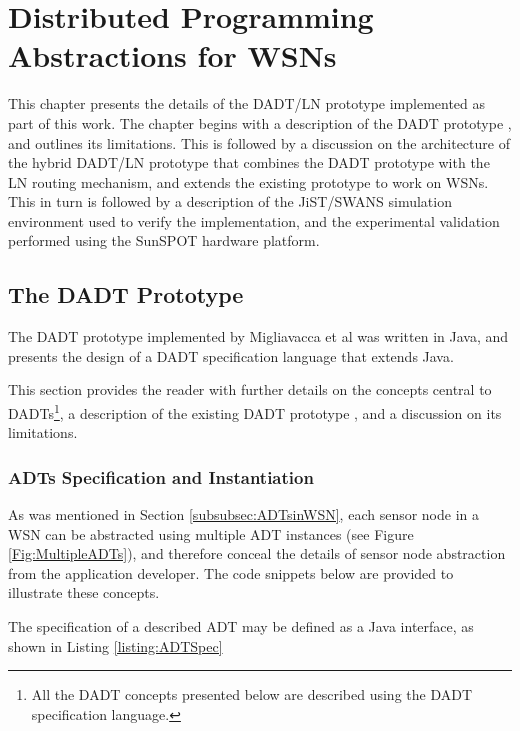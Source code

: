 \chapter{Distributed Programming Abstractions for WSNs} \label{chap:Implementation}
\label{chap:Implementation}

This chapter presents the details of the DADT/LN prototype implemented as part of
this work. The chapter begins with a description of the DADT prototype
\cite{migliavacca_DADT:2006}, and outlines its limitations. This is followed by a
discussion on the architecture of the hybrid DADT/LN prototype that combines the
DADT prototype with the LN routing mechanism, and extends the existing prototype
to work on WSNs. This in turn is followed by a description of the JiST/SWANS simulation
environment used to verify the implementation, and the experimental validation
performed using the SunSPOT hardware platform.

\section {The DADT Prototype}

The DADT prototype implemented by Migliavacca et al \cite{migliavacca_DADT:2006} was written in Java, and presents the design of a DADT specification language that extends Java.

This section provides the reader with
further details on the concepts central to DADTs\footnote{All the DADT concepts presented below
are described using the DADT specification language.}, a description of the
existing DADT prototype \cite{migliavacca_DADT:2006}, and a discussion on its limitations.

\subsection{ADTs Specification and Instantiation} \label{subsec:ADTSpecInst}

As was mentioned in Section \ref{subsubsec:ADTsinWSN}, each sensor node
in a WSN can be abstracted using multiple ADT instances (see
Figure \ref{Fig:MultipleADTs}), and therefore conceal the details of sensor
node abstraction from the application developer. The code snippets below are
provided to illustrate these concepts.

The specification of a described ADT may be defined as a Java
interface, as shown in Listing \ref{listing:ADTSpec}

